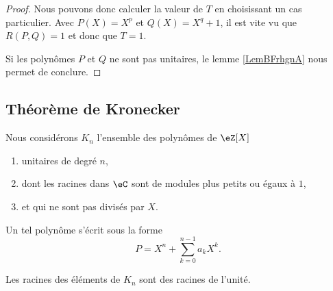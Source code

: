 \begin{proof}
    Nous pouvons donc calculer la valeur de \( T\) en choisissant un cas particulier. Avec \( P(X)=X^p\) et \( Q(X)=X^q+1\), il est vite vu que \( R(P,Q)=1\) et donc que \( T=1\).

    Si les polynômes \( P\) et \( Q\) ne sont pas unitaires, le lemme \ref{LemBFrhgnA} nous permet de conclure. 

\end{proof}


\subsection{Théorème de Kronecker}

Nous considérons \( K_n\) l'ensemble des polynômes de \( \eZ[X]\)
\begin{enumerate}
    \item
        unitaires de degré \( n\),
    \item
        dont les racines dans \( \eC\) sont de modules plus petits ou égaux à \( 1\),
    \item
        et qui ne sont pas divisés par \( X\).
\end{enumerate}
Un tel polynôme s'écrit sous la forme
\begin{equation}
    P=X^n+\sum_{k=0}^{n-1}a_kX^k.
\end{equation}

\begin{theorem}    \label{ThoOWMNAVp}
    Les racines des éléments de \( K_n\) sont des racines de l'unité.
\end{theorem}

